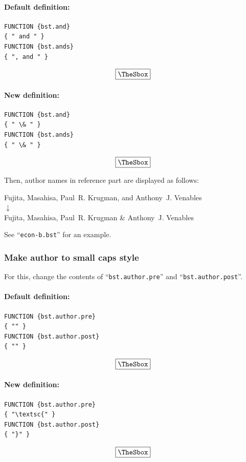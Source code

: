\documentclass[10pt]{article}
\newenvironment{Frame}%
{\setlength{\fboxsep}{15pt}
\setlength{\mylength}{\linewidth}%
\addtolength{\mylength}{-2\fboxsep}%
\addtolength{\mylength}{-2\fboxrule}%
\Sbox
\minipage{\mylength}%
\setlength{\abovedisplayskip}{0pt}%
\setlength{\belowdisplayskip}{0pt}%
}%
{\endminipage\endSbox
\[\fbox{\TheSbox}\]}
\begin{document}
\paragraph{Default definition:}
\begin{Frame}
\begin{verbatim}
FUNCTION {bst.and}
{ " and " }
FUNCTION {bst.ands}
{ ", and " }
\end{verbatim}
\end{Frame}

\paragraph{New definition:}
\begin{Frame}
\begin{verbatim}
FUNCTION {bst.and}
{ " \& " }
FUNCTION {bst.ands}
{ " \& " }
\end{verbatim}
\end{Frame}

Then, author names in reference part are displayed as follows:
\begin{center}
Fujita, Masahisa, Paul~R. Krugman, and Anthony~J. Venables \\
 $\downarrow$ \\
Fujita, Masahisa, Paul~R. Krugman \& Anthony~J. Venables 
\end{center}

See ``\texttt{econ-b.bst}'' for an example.

\subsubsection{Make author to small caps style}

For this, change the contents of ``\texttt{bst.author.pre}'' and ``\texttt{bst.author.post}''.
\paragraph{Default definition:}
\begin{Frame}
\begin{verbatim}
FUNCTION {bst.author.pre}
{ "" }
FUNCTION {bst.author.post}
{ "" }
\end{verbatim}
\end{Frame}

\paragraph{New definition:}
\begin{Frame}
\begin{verbatim}
FUNCTION {bst.author.pre}
{ "\textsc{" }
FUNCTION {bst.author.post}
{ "}" }
\end{verbatim}
\end{Frame}
\end{document}
